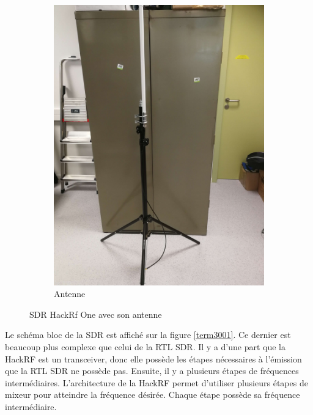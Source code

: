 \begin{figure}[h]
\hspace{0.5cm} %
\begin{subfigure}{0.4\textwidth}
  \centering
  \includegraphics[width=\textwidth]{images/pied.png}
  \caption{Antenne}
  \label{term340}
\end{subfigure}
\caption{SDR HackRf One avec son antenne}
\label{bothimages}
\end{figure}


Le schéma bloc de la SDR est affiché sur la figure \ref{term3001}. Ce dernier est beaucoup plus complexe que celui de la RTL SDR. Il y a d'une part que la HackRF est un transceiver, donc elle possède les étapes nécessaires à l'émission que la RTL SDR ne possède pas. Ensuite, il y a plusieurs étapes de fréquences intermédiaires. L'architecture de la HackRF \footnotemark[10] permet d'utiliser plusieurs étapes de mixeur pour atteindre la fréquence désirée. Chaque étape possède sa fréquence intermédiaire.

